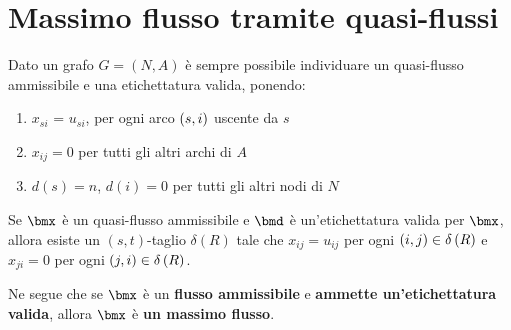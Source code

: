 \documentclass[\main/main.tex]{subfiles}
\begin{document}
\section{Massimo flusso tramite quasi-flussi}
Dato un grafo \(G = (N, A)\) è sempre possibile individuare un quasi-flusso ammissibile e una etichettatura valida, ponendo:

\begin{enumerate}
  \item \(x_{si}\) = \(u_{si}\), per ogni arco \(\left(s,i\right)\) uscente da \(s\)
  \item \(x_{ij} = 0\) per tutti gli altri archi di \(A\)
  \item \(d(s) = n\), \(d(i) = 0\) per tutti gli altri nodi di \(N\)
\end{enumerate}

\begin{theorem}
  Se \(\bmx\) è un quasi-flusso ammissibile e \(\bmd\) è un'etichettatura valida per \(\bmx\), allora esiste un \((s,t)\)-taglio \(\delta(R)\) tale che \(x_{ij}=u_{ij}\) per ogni \(\left(i,j\right)\in \delta\left(R\right)\) e \(x_{ji}=0\) per ogni \(\left(j,i\right) \in \delta\left(R\right)\).

  Ne segue che se \(\bmx\) è un \textbf{flusso ammissibile} e \textbf{ammette un'etichettatura valida}, allora \(\bmx\) è \textbf{un massimo flusso}.
\end{theorem}
\end{document}
